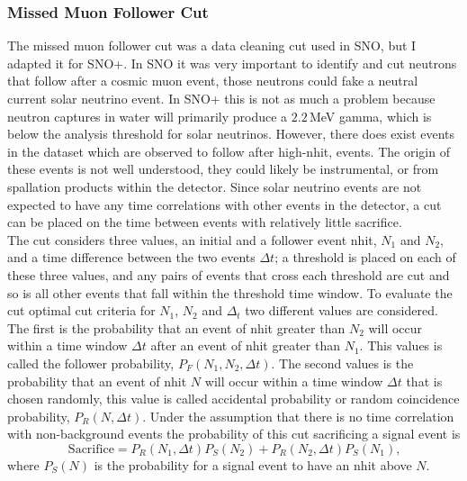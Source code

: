 \subsubsection{Missed Muon Follower Cut}
The missed muon follower cut was a data cleaning cut used in SNO, but I adapted
it for SNO+.
In SNO it was very important to identify and cut neutrons that follow
after a cosmic muon event, those neutrons could fake
a neutral current solar neutrino event.
In SNO+ this is not as much a problem because neutron captures in water will
primarily produce a $2.2$\,MeV gamma, which is below the analysis threshold for
solar neutrinos.
However, there does exist events in the dataset which are observed to follow
after high-nhit, events. The origin of these events is not well understood, they
could likely be instrumental, or from  spallation products within the detector.
Since solar neutrino events are not expected to have any time correlations
with other events in the detector, a cut can be placed on the time between
events with relatively little sacrifice.\\

The cut considers three values, an initial and a follower event nhit, $N_{1}$
and $N_{2}$, and a time difference between the two events $\Delta t$;
a threshold is placed on each of these three values, and any pairs of events that cross
each threshold are cut and so is all other events that fall within the threshold
time window.
To evaluate the cut optimal cut criteria for $N_{1}$, $N_{2}$ and $\Delta_{t}$
two different values are considered.
The first is the probability that an event of nhit greater than $N_{2}$ will occur within a time
window $\Delta t$ after an event of nhit greater than $N_{1}$.
This values is called the follower probability, $P_{F}(N_{1}, N_{2}, \Delta t)$.
The second values is the probability that an event of nhit $N$ will occur
within a time window $\Delta t$ that is chosen randomly, this value
is called accidental probability or random coincidence probability, $P_{R}(N, \Delta t)$.
Under the assumption that there is no time correlation with non-background
events the probability of this cut sacrificing a signal event is
\begin{equation}
    \mathrm{Sacrifice} = P_{R}(N_{1},\Delta t)P_{S}(N_{2}) + P_{R}(N_{2}, \Delta t)P_{S}(N_{1})\text{,}
\end{equation}
where $P_{S}(N)$ is the probability for a signal event to have an nhit above
$N$.

